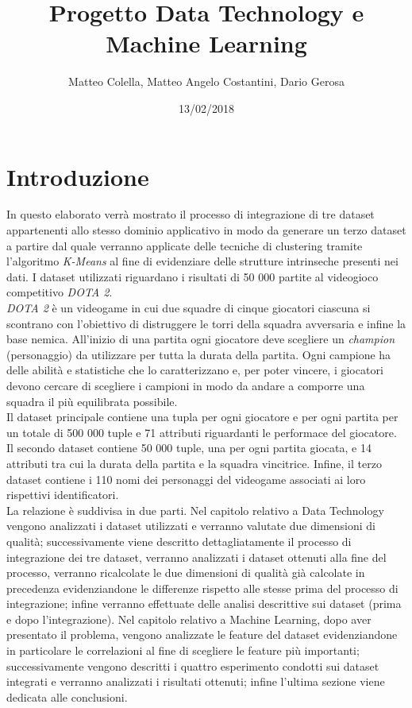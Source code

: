 \documentclass[a4paper,12pt,openany,oneside]{book}
\title{Progetto Data Technology e Machine Learning}
\author{Matteo Colella, Matteo Angelo Costantini, Dario Gerosa}
\date{13/02/2018}
\begin{document}
\selectfont
\maketitle

\tableofcontents

\chapter{Introduzione}
In questo elaborato verrà mostrato il processo di integrazione di tre dataset appartenenti allo stesso dominio applicativo in modo da generare un terzo dataset a partire dal quale verranno applicate delle tecniche di clustering tramite l'algoritmo \textit{K-Means} al fine di evidenziare delle strutture intrinseche presenti nei dati.
I dataset utilizzati riguardano i risultati di 50 000 partite al videogioco competitivo \textit{DOTA 2}.
\\[0.8em]
\textit{DOTA 2} è un videogame in cui due squadre di cinque giocatori ciascuna si scontrano con l'obiettivo di distruggere le torri della squadra avversaria e infine la base nemica. All'inizio di una partita ogni giocatore deve scegliere un \textit{champion} (personaggio) da utilizzare per tutta la durata della partita. Ogni campione ha delle abilità e statistiche che lo caratterizzano e, per poter vincere, i giocatori devono cercare di scegliere i campioni in modo da andare a comporre una squadra il più equilibrata possibile.
\\[0.8em]
Il dataset principale contiene una tupla per ogni giocatore e per ogni partita per un totale di 500 000 tuple e 71 attributi riguardanti le performace del giocatore. Il secondo dataset contiene 50 000 tuple, una per ogni partita giocata, e 14 attributi tra cui la durata della partita e la squadra vincitrice. Infine, il terzo dataset contiene i 110 nomi dei personaggi del videogame associati ai loro rispettivi identificatori.
\\[0.8em]
La relazione è suddivisa in due parti. Nel capitolo relativo a Data Technology vengono analizzati i dataset utilizzati e verranno valutate due dimensioni di qualità; successivamente viene descritto dettagliatamente il processo di integrazione dei tre dataset, verranno analizzati i dataset ottenuti alla fine del processo, verranno ricalcolate le due dimensioni di qualità già calcolate in precedenza evidenziandone le differenze rispetto alle stesse prima del processo di integrazione; infine verranno effettuate delle analisi descrittive sui dataset (prima e dopo l'integrazione). Nel capitolo relativo a Machine Learning, dopo aver presentato il problema, vengono analizzate le feature del dataset evidenziandone in particolare le correlazioni al fine di scegliere le feature più importanti; successivamente vengono descritti i quattro esperimento condotti sui dataset integrati e verranno analizzati i risultati ottenuti; infine l'ultima sezione viene dedicata alle conclusioni.
\end{document}
